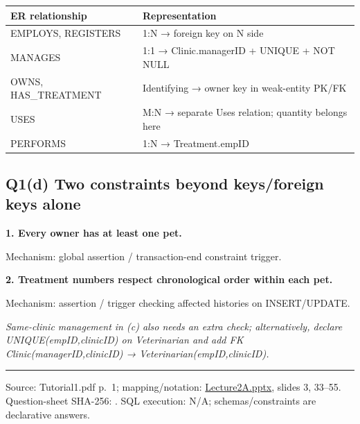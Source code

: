 \begin{longtable}[]{@{}ll@{}}
\toprule\noalign{}
ER relationship & Representation \\
\midrule\noalign{}
\endhead
\bottomrule\noalign{}
\endlastfoot
EMPLOYS, REGISTERS & 1:N → foreign key on N side \\
MANAGES & 1:1 → Clinic.managerID + UNIQUE + NOT NULL \\
OWNS, HAS\_TREATMENT & Identifying → owner key in weak-entity PK/FK \\
USES & M:N → separate Uses relation; quantity belongs here \\
PERFORMS & 1:N → Treatment.empID \\
\end{longtable}

\subsection{Q1(d) Two constraints beyond keys/foreign keys alone}\label{tutorial1_answers-q1d-two-constraints-beyond-keysforeign-keys-alone}

\textbf{1. Every owner has at least one pet.}


Mechanism: global assertion / transaction-end constraint trigger.

\textbf{2. Treatment numbers respect chronological order within each pet.}


Mechanism: assertion / trigger checking affected histories on INSERT/UPDATE.

\emph{Same-clinic management in (c) also needs an extra check; alternatively, declare UNIQUE(empID,\allowbreak{}clinicID) on Veterinarian and add FK Clinic(managerID,clinicID) → Veterinarian(empID,clinicID).}

\begin{center}\rule{0.5\linewidth}{0.5pt}\end{center}

Source: Tutorial1.pdf p.~1; mapping/notation: \href{../../../slides/Lecture2A.pptx}{Lecture2A.pptx}, slides 3, 33--55. Question-sheet SHA-256: \texttt{}. SQL execution: N/A; schemas/constraints are declarative answers.

